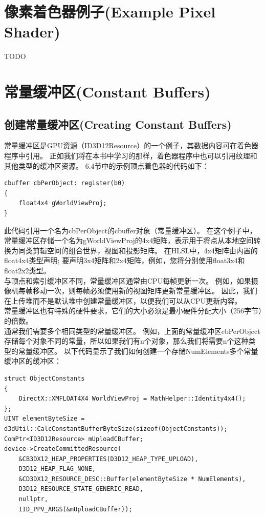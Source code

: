\documentclass[11pt,a4paper,oldfontcommands]{memoir}
\begin{document}
{\section{像素着色器例子(Example Pixel Shader)}
TODO
\section{常量缓冲区(Constant Buffers)}
\subsection{创建常量缓冲区(Creating Constant Buffers)}
\begin{flushleft}
常量缓冲区是GPU资源（ID3D12Resource）的一个例子，其数据内容可在着色器程序中引用。 正如我们将在本书中学习的那样，着色器程序中也可以引用纹理和其他类型的缓冲区资源。 6.4节中的示例顶点着色器的代码如下：
\begin{lstlisting}
cbuffer cbPerObject: register(b0)
{
    float4x4 gWorldViewProj;
}
\end{lstlisting}
此代码引用一个名为cbPerObject的cbuffer对象（常量缓冲区）。 在这个例子中，常量缓冲区存储一个名为gWorldViewProj的4x4矩阵，表示用于将点从本地空间转换为同类剪辑空间的组合世界，视图和投影矩阵。 在HLSL中，4x4矩阵由内置的float4x4类型声明; 要声明3x4矩阵和2x4矩阵，例如，您将分别使用float3x4和float2x2类型。\\
与顶点和索引缓冲区不同，常量缓冲区通常由CPU每帧更新一次。 例如，如果摄像机每帧移动一次，则每帧必须使用新的视图矩阵更新常量缓冲区。 因此，我们在上传堆而不是默认堆中创建常量缓冲区，以便我们可以从CPU更新内容。\\
常量缓冲区也有特殊的硬件要求，它们的大小必须是最小硬件分配大小（256字节）的倍数。\\
通常我们需要多个相同类型的常量缓冲区。 例如，上面的常量缓冲区cbPerObject存储每个对象不同的常量，所以如果我们有n个对象，那么我们将需要n个这种类型的常量缓冲区。 以下代码显示了我们如何创建一个存储NumElements多个常量缓冲区的缓冲区：
\begin{lstlisting}
struct ObjectConstants
{
    DirectX::XMFLOAT4X4 WorldViewProj = MathHelper::Identity4x4();
};
UINT elementByteSize = d3dUtil::CalcConstantBufferByteSize(sizeof(ObjectConstants));
ComPtr<ID3D12Resource> mUploadCBuffer;
device->CreateCommittedResource(
    &CB3DX12_HEAP_PROPERTIES(D3D12_HEAP_TYPE_UPLOAD), 
    D3D12_HEAP_FLAG_NONE, 
    &CD3DX12_RESOURCE_DESC::Buffer(elementByteSize * NumElements),
    D3D12_RESOURCE_STATE_GENERIC_READ,
    nullptr, 
    IID_PPV_ARGS(&mUploadCBuffer));
\end{lstlisting}

\end{flushleft}}
\end{document}
